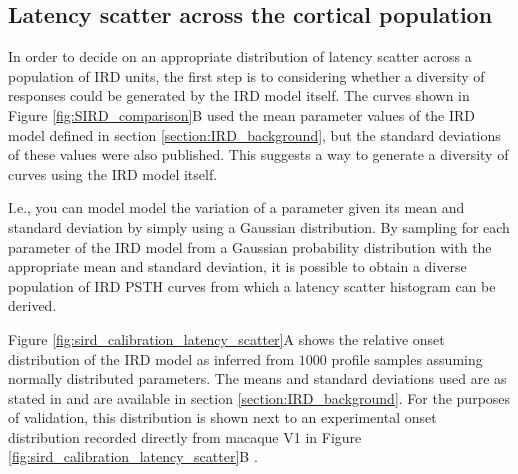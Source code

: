 \documentclass[phd,ianc,twoside]{infthesis}
\begin{document}
\subsection{Latency scatter across the cortical population}
\label{section:latency_scatter}

In order to decide on an appropriate distribution of latency scatter
across a population of IRD units, the first step is to considering
whether a diversity of responses could be generated by the IRD model
itself. The curves shown in Figure \ref{fig:SIRD_comparison}B used the
mean parameter values of the IRD model defined in section
\ref{section:IRD_background}, but the standard deviations of these
values were also published. This suggests a way to generate a diversity
of curves using the IRD model itself.

I.e., you can model model the variation of a parameter given its mean and
standard deviation by simply using a Gaussian distribution. By sampling for
each parameter of the IRD model from a Gaussian probability distribution
with the appropriate mean and standard deviation, it is possible to
obtain a diverse population of IRD PSTH curves from which a latency
scatter histogram can be derived.

Figure \ref{fig:sird_calibration_latency_scatter}A shows the relative
onset distribution of the IRD model as inferred from $1000$ profile
samples assuming normally distributed parameters. The means and standard
deviations used are as stated in \citet{albrecht_jneurophys02} and are
available in section \ref{section:IRD_background}. For the purposes of
validation, this distribution is shown next to an experimental onset
distribution recorded directly from macaque V1 in Figure
\ref{fig:sird_calibration_latency_scatter}B \citep{nowak_visneuro95}.
\end{document}
